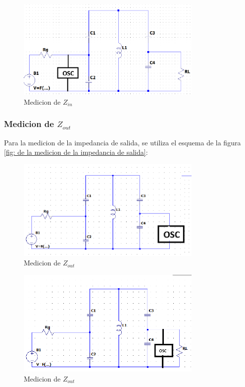 \begin{figure}[h]
    \centering
    \includegraphics[width=0.8\textwidth]{Imagenes/medicion_zin2.png}
    \caption{Medicion de $Z_{in}$}
    \label{fig: de la medicion de la impedancia de entrada 2}
\end{figure}


\subsubsection{Medicion de $Z_{out}$}

Para la medicion de la impedancia de salida, se utiliza el esquema de la figura \ref{fig: de la medicion de la impedancia de salida}:

%
\begin{figure}[h]
    \centering
    \includegraphics[width=0.8\textwidth]{Imagenes/medicion_zout1.png}
    \caption{Medicion de $Z_{out}$}
    \label{fig: Primer esquema de la medicion de la impedancia de salida}
\end{figure}

% 
\begin{figure}[h]
    \centering
    \includegraphics[width=0.8\textwidth]{Imagenes/medicion_zout2.png}
    \caption{Medicion de $Z_{out}$}
    \label{fig: Segundo esquema de la medicion de la impedancia de salida}
\end{figure}